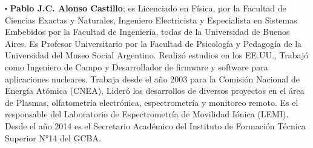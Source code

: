 \documentclass[
11pt, %
spanish,
singlespacing, %
parskip, %
headsepline, %
]{MastersDoctoralThesis} %
\begin{document}
\begin{sloppypar}
$\centerdot$ \textbf{Pablo J.C. Alonso Castillo}; es Licenciado en Física, por la Facultad de Ciencias Exactas y Naturales, Ingeniero Electricista y Especialista en Sistemas Embebidos por la Facultad de Ingeniería, todas de la Universidad de Buenos Aires. Es Profesor Universitario  por la Facultad de Psicología y Pedagogía de la Universidad del Museo Social Argentino. Realizó estudios en los EE.UU., Trabajó como Ingeniero de Campo y Desarrollador de firmware y software para aplicaciones nucleares. Trabaja desde el año 2003 para la Comisión Nacional de Energía Atómica (CNEA), Lideró los desarrollos de diversos proyectos en el área de Plasmas, olfatometría electrónica, espectrometría y monitoreo remoto. Es el responsable del Laboratorio de Espectrometría de Movilidad Iónica (LEMI). Desde el año 2014 es el Secretario Académico del Instituto de Formación Técnica Superior N°14 del GCBA.

\end{sloppypar}





\mainmatter %

\pagestyle{thesis} %






%





%
 
\end{document}

